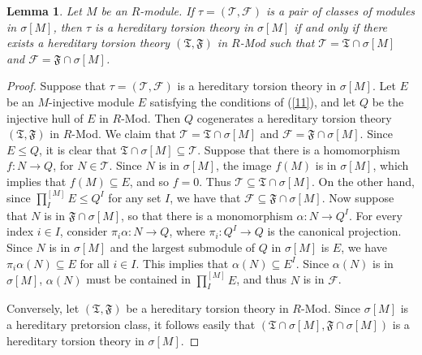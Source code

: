 \documentclass[10pt,a4paper]{amsart}
\newtheorem{lemma}{Lemma}
\newcommand{\sm}{\sigma[M]}
\begin{document}
	\begin{lemma}
		Let $M$ be an $R$-module. 
		If $\tau=(\mathcal{T},\mathcal{F})$ 
		is a pair of classes of modules in $\sm$, 
		then $\tau$ is a hereditary torsion theory in $\sm$ 
		if and only if 
		there exists a hereditary torsion theory 
		$(\mathfrak{T},\mathfrak{F})$ in $R$-Mod 
		such that $\mathcal{T}=\mathfrak{T}\cap\sm$ and 
		$\mathcal{F}=\mathfrak{F}\cap\sm$.
	\end{lemma}

	\begin{proof}
		Suppose that $\tau=(\mathcal{T},\mathcal{F})$ 
		is a hereditary torsion theory in $\sm$. 
		Let $E$ be an $M$-injective module $E$ satisfying 
		the conditions of (\ref{11}), 
		and let $Q$ be the injective hull of $E$ in $R$-Mod. 
		Then $Q$ cogenerates a hereditary torsion theory 
		$(\mathfrak{T},\mathfrak{F})$ in $R$-Mod. 
		We claim that $\mathcal{T}=\mathfrak{T}\cap\sm$ and 
		$\mathcal{F}=\mathfrak{F}\cap\sm$. 
		Since $E\leq Q$, 
		it is clear that $\mathfrak{T}\cap\sm\subseteq \mathcal{T}$. 
		Suppose that there is a homomorphism $f:N\to Q$,
		for $N\in\mathcal{T}$. 
		Since $N$ is in $\sm$, 
		the image $f(M)$ is in $\sm$, 
		which implies that $f(M)\subseteq E$, and so $f=0$. 
		Thus $\mathcal{T}\subseteq\mathfrak{T}\cap\sm$. 
		On the other hand, since $\prod_I^{[M]}E\leq Q^I$ for any set $I$, 
		we have that $\mathcal{F}\subseteq \mathfrak{F}\cap\sm$. 
		Now suppose that $N$ is in $\mathfrak{F}\cap\sm$, 
		so that there is a monomorphism $\alpha:N\to Q^I$. 
		For every index $i\in I$, 
		consider $\pi_i\alpha:N\to Q$, 
		where $\pi_i:Q^I\to Q$ is the canonical projection. 
		Since $N$ is in $\sm$ and the largest submodule of $Q$ in $\sm$ is $E$, 
		we have $\pi_i\alpha(N)\subseteq E$ for all $i\in I$. 
		This implies that $\alpha(N)\subseteq E^I$. 
		Since $\alpha(N)$ is in $\sm$, 
		$\alpha(N)$ must be contained in $\prod_I^{[M]}E$, 
		and thus $N$ is in $\mathcal{F}$. 
		
		Conversely, let $(\mathfrak{T},\mathfrak{F})$ 
		be a hereditary torsion theory in $R$-Mod. 
		Since $\sm$ is a hereditary pretorsion class,
		it follows easily that $(\mathfrak{T}\cap\sm,\mathfrak{F}\cap\sm)$ 
		is a hereditary torsion theory in $\sm$.	
	\end{proof}
\end{document}
